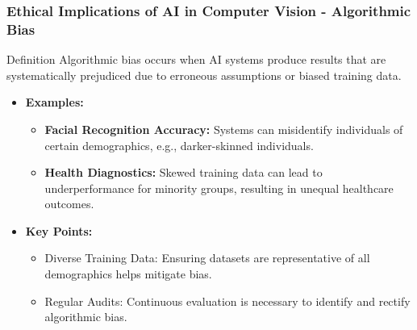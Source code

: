 \documentclass[aspectratio=169]{beamer}
\begin{document}
\begin{frame}[fragile]
    \frametitle{Ethical Implications of AI in Computer Vision - Algorithmic Bias}
    \begin{block}{Definition}
        Algorithmic bias occurs when AI systems produce results that are systematically prejudiced due to erroneous assumptions or biased training data.
    \end{block}

    \begin{itemize}
        \item \textbf{Examples:}
        \begin{itemize}
            \item \textbf{Facial Recognition Accuracy:} Systems can misidentify individuals of certain demographics, e.g., darker-skinned individuals.
            \item \textbf{Health Diagnostics:} Skewed training data can lead to underperformance for minority groups, resulting in unequal healthcare outcomes.
        \end{itemize}
        \item \textbf{Key Points:}
        \begin{itemize}
            \item Diverse Training Data: Ensuring datasets are representative of all demographics helps mitigate bias.
            \item Regular Audits: Continuous evaluation is necessary to identify and rectify algorithmic bias.
        \end{itemize}
    \end{itemize}
\end{frame}
\end{document}

